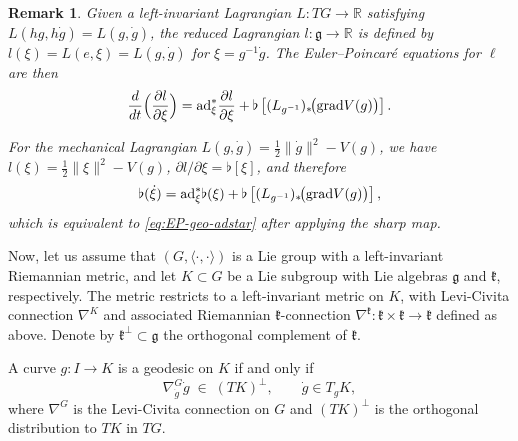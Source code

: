 \documentclass[letterpaper, 10 pt, conference]{ieeeconf}
\newtheorem{remark}{Remark}
\newcommand{\g}{\mathfrak{g}}
\newcommand{\grad}{\normalfont{\text{grad}}}
\newcommand{\ad}{\normalfont{\text{ad}}}
\begin{document}
\begin{remark}
Given a left-invariant Lagrangian $L:T G\to\mathbb{R}$ satisfying 
$L(hg,h\dot g)=L(g,\dot g)$, the reduced Lagrangian $l:\g\to\mathbb{R}$ is defined by
$l(\xi)=L(e,\xi)=L(g,\dot g)$ for $\xi=g^{-1}\dot g$.
The Euler--Poincar\'e equations for $\ell$ are then
 \[
\frac{d}{dt}\Big(\frac{\partial l}{\partial\xi}\Big)
= \ad^\ast_\xi\frac{\partial l}{\partial\xi}
    + \flat\left[(L_{g^{-1}})_\ast\!\big(\grad V(g)\big)\right] .
\]

For the mechanical Lagrangian $L(g,\dot g)=\tfrac12\|\dot g\|^2 - V(g)$,
we have $l(\xi)=\tfrac12\|\xi\|^2 - V(g)$, 
$\partial l/\partial\xi=\flat[\xi]$, and therefore
\[
\flat(\dot\xi) 
= \ad^\ast_\xi\flat(\xi) 
    + \flat\left[(L_{g^{-1}})_\ast\!\big(\grad V(g)\big)\right],
\]
which is equivalent to \eqref{eq:EP-geo-adstar} after applying the sharp map.
\end{remark}



Now, let us assume that $(G,\langle\cdot,\cdot\rangle)$ is a Lie group with a left-invariant Riemannian metric,
and let $K\subset G$ be a Lie subgroup with Lie algebras $\mathfrak{g}$ and $\mathfrak{k}$, respectively. 
The metric restricts to a left-invariant metric on $K$, with Levi-Civita connection
$\nabla^K$ and associated Riemannian $\mathfrak{k}$-connection 
$\nabla^{\mathfrak{k}}:\mathfrak{k}\times\mathfrak{k}\to\mathfrak{k}$ defined
as above. Denote by $\mathfrak{k}^\perp\subset\mathfrak{g}$ 
the orthogonal complement of $\mathfrak{k}$.

A curve $g:I\to K$ is a geodesic on $K$ if and only if
\[
\nabla^G_{\dot g}\dot g \;\in\; (T K)^\perp,
\qquad
\dot g\in T_gK,
\]
where $\nabla^G$ is the Levi-Civita connection on $G$ and $(T K)^\perp$ is the orthogonal
distribution to $T K$ in $T G$.
\end{document}
